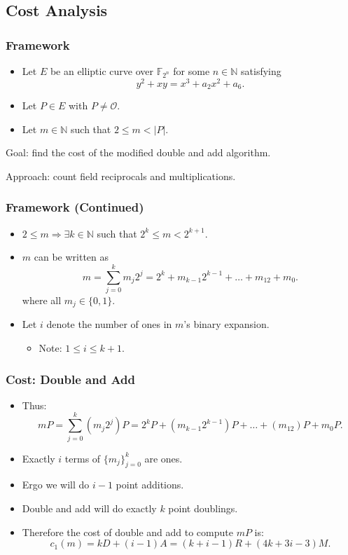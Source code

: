 \documentclass[xcolor=pdftex,dvipsnames,table]{beamer}
\theoremstyle{plain}
\theoremstyle{definition}
\def\NN{\mathbb{N}}
\def\FF{\mathbb{F}}
\newcommand{\set}[1]{\lbrace #1 \rbrace}
\newcommand{\paren}[1]{\left( #1 \right)}
\begin{document}
\subsection[Cost Analysis]{Cost Analysis}

\begin{frame}
	\frametitle{Framework}
	\begin{itemize}
		\item Let $E$ be an elliptic curve over $\FF_{2^n}$ for some $n\in\NN$ satisfying 
		\[
		y^2+xy=x^3+a_2x^2+a_6.
		\]
		
		\item Let $P\in E$ with $P\neq\mathcal{O}$.
		
		\item Let $m\in\NN$ such that $2\leq m <|P|$.
	\end{itemize}
	
	Goal: find the cost of the modified double and add algorithm.
	
	Approach: count field reciprocals and multiplications.
\end{frame}

\begin{frame}
	\frametitle{Framework (Continued)}
	
	\begin{itemize}
		\item $2\leq m\Rightarrow\exists k\in\NN$ such that $2^k\leq m<2^{k+1}$.
		\item $m$ can be written as
		\[
		m=\sum_{j=0}^k m_j2^j=2^k+m_{k-1}2^{k-1}+\ldots +m_12+m_0.
		\]
		where all $m_j\in\set{0,1}$.
		\item Let $i$ denote the number of ones in $m$'s binary expansion.
		\begin{itemize}
			\item Note: $1\leq i\leq k+1$.
		\end{itemize}
	\end{itemize}
\end{frame}

\begin{frame}
	\frametitle{Cost: Double and Add}
	
	\begin{itemize}
		\item Thus:
		\[
		mP=\sum_{j=0}^k \paren{m_j2^j}P=2^kP+\paren{m_{k-1}2^{k-1}}P+\ldots +\paren{m_12}P+m_0P.
		\]
		
		\item Exactly $i$ terms of $\set{m_j}_{j=0}^k$ are ones.
		
		\item Ergo we will do $i-1$ point additions.
		
		\item Double and add will do exactly $k$ point doublings.
		
		\item Therefore the cost of double and add to compute $mP$ is:
		\[
		c_1(m)=kD+(i-1)A=(k+i-1)R + (4k+3i-3)M.
		\]
	\end{itemize}
\end{frame}
\end{document}
